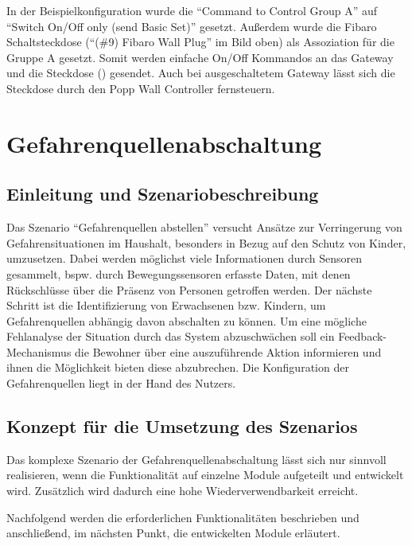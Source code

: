 In der Beispielkonfiguration wurde die "`Command to Control Group A"' auf "`Switch On/Off only (send Basic Set)"' gesetzt. Außerdem wurde die Fibaro Schaltsteckdose ("`(\#9) Fibaro Wall Plug"' im Bild oben) als Assoziation für die Gruppe A gesetzt. Somit werden einfache On/Off Kommandos an das Gateway und die Steckdose () gesendet. Auch bei ausgeschaltetem Gateway lässt sich die Steckdose durch den Popp Wall Controller fernsteuern.


\newpage
\section{Gefahrenquellenabschaltung}
\label{sec:gefahrenquellenabschaltung}

\subsection{Einleitung und Szenariobeschreibung}
Das Szenario "`Gefahrenquellen abstellen"' versucht Ansätze zur Verringerung von Gefahrensituationen im Haushalt, besonders in Bezug auf den Schutz von Kinder, umzusetzen. Dabei werden möglichst viele Informationen durch Sensoren gesammelt, bspw. durch Bewegungssensoren erfasste Daten, mit denen Rückschlüsse über die Präsenz von Personen getroffen werden. Der nächste Schritt ist die Identifizierung von Erwachsenen bzw. Kindern, um Gefahrenquellen abhängig davon abschalten zu können. Um eine mögliche Fehlanalyse der Situation durch das System abzuschwächen soll ein Feedback-Mechanismus die Bewohner über eine auszuführende Aktion informieren und ihnen die Möglichkeit bieten diese abzubrechen. Die Konfiguration der Gefahrenquellen liegt in der Hand des Nutzers.

\subsection{Konzept für die Umsetzung des Szenarios}
Das komplexe Szenario der Gefahrenquellenabschaltung lässt sich nur sinnvoll realisieren, wenn die Funktionalität auf einzelne Module aufgeteilt und entwickelt wird. Zusätzlich wird dadurch eine hohe Wiederverwendbarkeit erreicht.

Nachfolgend werden die erforderlichen Funktionalitäten beschrieben und anschließend, im nächsten Punkt, die entwickelten Module erläutert.

